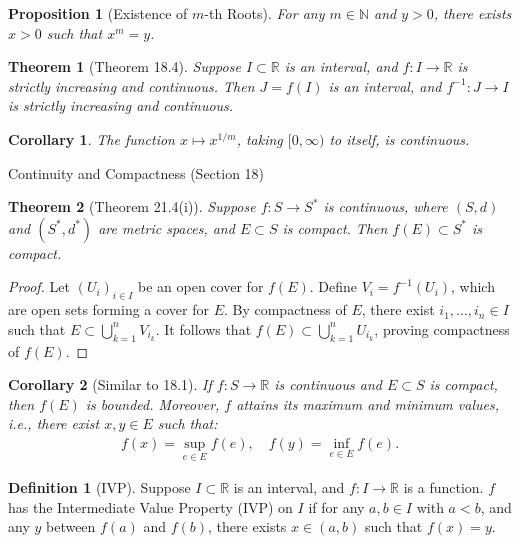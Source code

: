 \documentclass[7pt]{article}
\theoremstyle{definition}
\newtheorem{definition}{Definition}
\theoremstyle{plain}
\newtheorem{theorem}{Theorem}
\newtheorem{proposition}{Proposition}
\newtheorem{corollary}{Corollary}
\begin{document}
\begin{proposition}[Existence of $ m $-th Roots]
For any $ m \in \mathbb{N} $ and $ y > 0 $, there exists $ x > 0 $ such that $ x^m = y $.
\end{proposition}

\begin{theorem}[Theorem 18.4]
Suppose $ I \subset \mathbb{R} $ is an interval, and $ f : I \to \mathbb{R} $ is strictly increasing and continuous. Then $ J = f(I) $ is an interval, and $ f^{-1} : J \to I $ is strictly increasing and continuous.
\end{theorem}

\begin{corollary}
The function $ x \mapsto x^{1/m} $, taking $ [0, \infty) $ to itself, is continuous.
\end{corollary}
{Continuity and Compactness (Section 18)}

\begin{theorem}[Theorem 21.4(i)]
Suppose $ f : S \to S^* $ is continuous, where $ (S, d) $ and $ (S^*, d^*) $ are metric spaces, and $ E \subset S $ is compact. Then $ f(E) \subset S^* $ is compact.
\end{theorem}

\begin{proof}
Let $ (U_i)_{i \in I} $ be an open cover for $ f(E) $. Define $ V_i = f^{-1}(U_i) $, which are open sets forming a cover for $ E $. By compactness of $ E $, there exist $ i_1, \ldots, i_n \in I $ such that $ E \subset \bigcup_{k=1}^n V_{i_k} $. It follows that $ f(E) \subset \bigcup_{k=1}^n U_{i_k} $, proving compactness of $ f(E) $.
\end{proof}

\begin{corollary}[Similar to 18.1]
If $ f : S \to \mathbb{R} $ is continuous and $ E \subset S $ is compact, then $ f(E) $ is bounded. Moreover, $ f $ attains its maximum and minimum values, i.e., there exist $ x, y \in E $ such that:
\begin{align}
f(x) = \sup_{e \in E} f(e), \quad f(y) = \inf_{e \in E} f(e).
\end{align}
\end{corollary}

\begin{definition}[IVP]
Suppose $ I \subset \mathbb{R} $ is an interval, and $ f : I \to \mathbb{R} $ is a function. $ f $ has the Intermediate Value Property (IVP) on $ I $ if for any $ a, b \in I $ with $ a < b $, and any $ y $ between $ f(a) $ and $ f(b) $, there exists $ x \in (a, b) $ such that $ f(x) = y $.
\end{definition}
\end{document}

